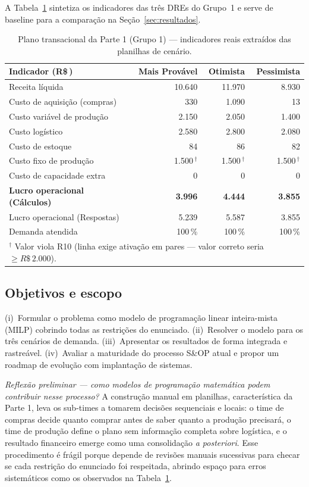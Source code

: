 \documentclass[11pt,a4paper]{article}
\newcommand{\rs}{R\$\,}
\begin{document}
A Tabela~\ref{tab:baseline-p1} sintetiza os indicadores das três DREs do Grupo~1 e serve de baseline para a comparação na Seção~\ref{sec:resultados}.

\begin{table}[h]
\centering
\caption{Plano transacional da Parte 1 (Grupo 1) — indicadores reais extraídos das planilhas de cenário.}
\label{tab:baseline-p1}
\begin{tabular}{lrrr}
\toprule
\textbf{Indicador (\rs)} & \textbf{Mais Provável} & \textbf{Otimista} & \textbf{Pessimista} \\
\midrule
Receita líquida                 & 10.640 & 11.970 & 8.930 \\
Custo de aquisição (compras)    & 330    & 1.090  & 13    \\
Custo variável de produção      & 2.150  & 2.050  & 1.400 \\
Custo logístico                 & 2.580  & 2.800  & 2.080 \\
Custo de estoque                & 84     & 86     & 82    \\
Custo fixo de produção          & 1.500\,$^\dagger$ & 1.500\,$^\dagger$ & 1.500\,$^\dagger$ \\
Custo de capacidade extra       & 0      & 0      & 0     \\
\textbf{Lucro operacional (Cálculos)} & \textbf{3.996} & \textbf{4.444} & \textbf{3.855} \\
Lucro operacional (Respostas)   & 5.239  & 5.587  & 3.855 \\
Demanda atendida                & 100\,\% & 100\,\% & 100\,\% \\
\bottomrule
\multicolumn{4}{l}{\footnotesize $^\dagger$ Valor viola R10 (linha exige ativação em pares — valor correto seria $\geq \rs 2.000$).}
\end{tabular}
\end{table}

\subsection{Objetivos e escopo}
(i)~Formular o problema como modelo de programação linear inteira-mista (MILP) cobrindo todas as restrições do enunciado.
(ii)~Resolver o modelo para os três cenários de demanda.
(iii)~Apresentar os resultados de forma integrada e rastreável.
(iv)~Avaliar a maturidade do processo S\&OP atual e propor um roadmap de evolução com implantação de sistemas.

\medskip\noindent
\emph{Reflexão preliminar — como modelos de programação matemática podem contribuir nesse processo?} A construção manual em planilhas, característica da Parte 1, leva os sub-times a tomarem decisões sequenciais e locais: o time de compras decide quanto comprar antes de saber quanto a produção precisará, o time de produção define o plano sem informação completa sobre logística, e o resultado financeiro emerge como uma consolidação \emph{a posteriori}. Esse procedimento é frágil porque depende de revisões manuais sucessivas para checar se cada restrição do enunciado foi respeitada, abrindo espaço para erros sistemáticos como os observados na Tabela~\ref{tab:baseline-p1}.
\end{document}
